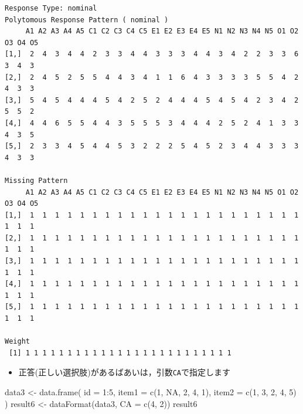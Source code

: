 \documentclass[
  a4paper,
]{ltjsbook}
\newenvironment{Shaded}{\begin{snugshade}}{\end{snugshade}}
\newcommand{\AttributeTok}[1]{\textcolor[rgb]{0.40,0.45,0.13}{#1}}
\newcommand{\ConstantTok}[1]{\textcolor[rgb]{0.56,0.35,0.01}{#1}}
\newcommand{\DecValTok}[1]{\textcolor[rgb]{0.68,0.00,0.00}{#1}}
\newcommand{\FunctionTok}[1]{\textcolor[rgb]{0.28,0.35,0.67}{#1}}
\newcommand{\NormalTok}[1]{\textcolor[rgb]{0.00,0.23,0.31}{#1}}
\newcommand{\OtherTok}[1]{\textcolor[rgb]{0.00,0.23,0.31}{#1}}
\newcommand{\SpecialCharTok}[1]{\textcolor[rgb]{0.37,0.37,0.37}{#1}}
\providecommand{\tightlist}{%
  \setlength{\itemsep}{0pt}\setlength{\parskip}{0pt}}\usepackage{longtable,booktabs,array}
\begin{document}
\begin{verbatim}
Response Type: nominal 
Polytomous Response Pattern ( nominal )
     A1 A2 A3 A4 A5 C1 C2 C3 C4 C5 E1 E2 E3 E4 E5 N1 N2 N3 N4 N5 O1 O2 O3 O4 O5
[1,]  2  4  3  4  4  2  3  3  4  4  3  3  3  4  4  3  4  2  2  3  3  6  3  4  3
[2,]  2  4  5  2  5  5  4  4  3  4  1  1  6  4  3  3  3  3  5  5  4  2  4  3  3
[3,]  5  4  5  4  4  4  5  4  2  5  2  4  4  4  5  4  5  4  2  3  4  2  5  5  2
[4,]  4  4  6  5  5  4  4  3  5  5  5  3  4  4  4  2  5  2  4  1  3  3  4  3  5
[5,]  2  3  3  4  5  4  4  5  3  2  2  2  5  4  5  2  3  4  4  3  3  3  4  3  3

Missing Pattern
     A1 A2 A3 A4 A5 C1 C2 C3 C4 C5 E1 E2 E3 E4 E5 N1 N2 N3 N4 N5 O1 O2 O3 O4 O5
[1,]  1  1  1  1  1  1  1  1  1  1  1  1  1  1  1  1  1  1  1  1  1  1  1  1  1
[2,]  1  1  1  1  1  1  1  1  1  1  1  1  1  1  1  1  1  1  1  1  1  1  1  1  1
[3,]  1  1  1  1  1  1  1  1  1  1  1  1  1  1  1  1  1  1  1  1  1  1  1  1  1
[4,]  1  1  1  1  1  1  1  1  1  1  1  1  1  1  1  1  1  1  1  1  1  1  1  1  1
[5,]  1  1  1  1  1  1  1  1  1  1  1  1  1  1  1  1  1  1  1  1  1  1  1  1  1

Weight
 [1] 1 1 1 1 1 1 1 1 1 1 1 1 1 1 1 1 1 1 1 1 1 1 1 1 1
\end{verbatim}

\begin{itemize}
\tightlist
\item
  正答(正しい選択肢)があるばあいは，引数\texttt{CA}で指定します
\end{itemize}

\begin{Shaded}
\begin{Highlighting}[]
\NormalTok{data3 }\OtherTok{\textless{}{-}} \FunctionTok{data.frame}\NormalTok{(}
    \AttributeTok{id =} \DecValTok{1}\SpecialCharTok{:}\DecValTok{5}\NormalTok{,}
    \AttributeTok{item1 =} \FunctionTok{c}\NormalTok{(}\DecValTok{1}\NormalTok{, }\ConstantTok{NA}\NormalTok{, }\DecValTok{2}\NormalTok{, }\DecValTok{4}\NormalTok{, }\DecValTok{1}\NormalTok{),}
    \AttributeTok{item2 =} \FunctionTok{c}\NormalTok{(}\DecValTok{1}\NormalTok{, }\DecValTok{3}\NormalTok{, }\DecValTok{2}\NormalTok{, }\DecValTok{4}\NormalTok{, }\DecValTok{5}\NormalTok{)}
\NormalTok{)}
\NormalTok{result6 }\OtherTok{\textless{}{-}} \FunctionTok{dataFormat}\NormalTok{(data3, }\AttributeTok{CA =} \FunctionTok{c}\NormalTok{(}\DecValTok{4}\NormalTok{, }\DecValTok{2}\NormalTok{))}
\NormalTok{result6}
\end{Highlighting}
\end{Shaded}
\end{document}
